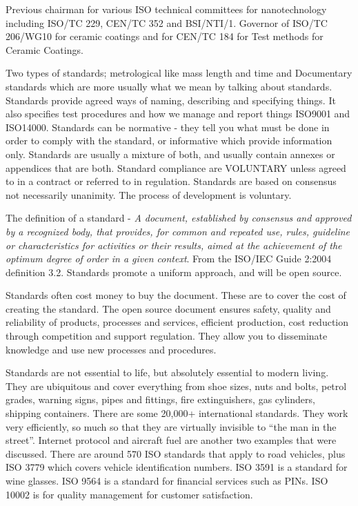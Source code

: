 Previous chairman for various ISO technical committees for nanotechnology including ISO/TC 229, CEN/TC 352 and BSI/NTI/1. 
Governor of ISO/TC 206/WG10 for ceramic coatings and for CEN/TC 184 for Test methods for Ceramic Coatings.

Two types of standards; metrological like mass length and time and Documentary standards which are more usually what we mean by talking about standards. 
Standards provide agreed ways of naming, describing and specifying things. 
It also specifies test procedures and how we manage and report things ISO9001 and ISO14000. 
Standards can be normative - they tell you what must be done in order to comply with the standard, or informative which provide information only. 
Standards are usually a mixture of both, and usually contain annexes or appendices that are both. 
Standard compliance are VOLUNTARY unless agreed to in a contract or referred to in regulation. 
Standards are based on consensus not necessarily unanimity. 
The process of development is voluntary. 

The definition of a standard - \textit{A document, established by consensus and approved by a recognized body, that provides, for common and repeated use, rules, guideline or characteristics for activities or their results, aimed at the achievement of the optimum degree of order in a given context}.
 From the ISO/IEC Guide 2:2004 definition 3.2. 
Standards promote a uniform approach, and will be open source.

Standards often cost money to buy the document. 
These are to cover the cost of creating the standard. 
The open source document ensures safety, quality and reliability of products, processes and services, efficient production, cost reduction through competition and support regulation. 
They allow you to disseminate knowledge and use new processes and procedures. 

Standards are not essential to life, but absolutely essential to modern living. 
They are ubiquitous and cover everything from shoe sizes, nuts and bolts, petrol grades, warning signs, pipes and fittings, fire extinguishers, gas cylinders, shipping containers. 
There are some 20,000+ international standards. 
They work very efficiently, so much so that they are virtually invisible to ``the man in the street''. Internet protocol and aircraft fuel are another two examples that were discussed. 
There are around 570 ISO standards that apply to road vehicles, plus ISO 3779 which covers vehicle identification numbers. ISO 3591 is a standard for wine glasses. 
ISO 9564 is a standard for financial services such as PINs. ISO 10002 is for quality management for customer satisfaction.

